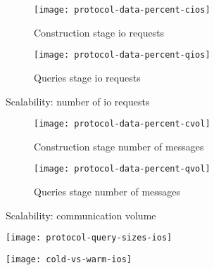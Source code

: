 \begin{figure}[ht!]
	\captionsetup{justification=centering}
	\centering
	\begin{subfigure}[t]{0.5\textwidth}
		\centering
		\texttt{[image: protocol-data-percent-cios]}
		\caption{Construction stage \acrshort{io} requests}%
		\label{figure:protocols-data-percent-ios:c}
	\end{subfigure}%
	\hfill
	\begin{subfigure}[t]{0.5\textwidth}
		\centering
		\texttt{[image: protocol-data-percent-qios]}
		\caption{Queries stage \acrshort{io} requests}%
		\label{figure:protocols-data-percent-ios:q}
	\end{subfigure}%
	\caption{Scalability: number of \acrshort{io} requests}%
	\label{figure:protocols-data-percent-ios}
\end{figure}

\begin{figure}[ht!]
	\captionsetup{justification=centering}
	\centering
	\begin{subfigure}[t]{0.5\textwidth}
		\centering
		\texttt{[image: protocol-data-percent-cvol]}
		\caption{Construction stage number of messages}%
		\label{figure:protocols-data-percent-vol:c}
	\end{subfigure}%
	\hfill
	\begin{subfigure}[t]{0.5\textwidth}
		\centering
		\texttt{[image: protocol-data-percent-qvol]}
		\caption{Queries stage number of messages}%
		\label{figure:protocols-data-percent-vol:q}
	\end{subfigure}%
	\caption{Scalability: communication volume}%
	\label{figure:protocols-data-percent-vol}
\end{figure}

\begin{figure}[ht!]
	\centering
	\begin{minipage}{.5\textwidth}
		\captionsetup[figure]{justification=centering}
		\centering
		\texttt{[image: protocol-query-sizes-ios]}
		\label{figure:protocols-query-sizes}
	\end{minipage}%
	\hfill
	\begin{minipage}{.5\textwidth}
		\captionsetup[figure]{justification=centering}
		\centering
		\texttt{[image: cold-vs-warm-ios]}
		\label{figure:cold-vs-warm}
	\end{minipage}
\end{figure}
